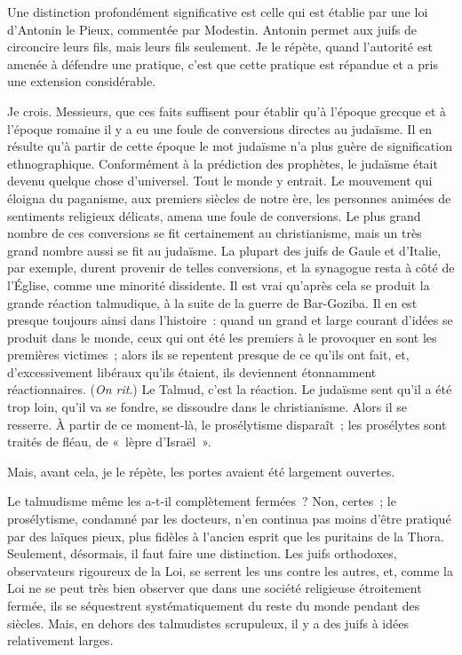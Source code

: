 \documentclass[french,twoside]{book} %
\newcommand\orgName[1]{#1}
\newcommand\persName[1]{#1}
\newcommand\placeName[1]{#1}
\begin{document}
Une distinction profondément significative est celle qui est établie par une loi d’{\persName Antonin le Pieux}, commentée par {\persName Modestin}. {\persName Antonin} permet aux juifs de circoncire leurs fils, mais leurs fils seulement. Je le répète, quand l’autorité est amenée à défendre une pratique, c’est que cette pratique est répandue et a pris une extension considérable.\par
Je crois. Messieurs, que ces faits suffisent pour établir qu’à l’époque grecque et à l’époque romaine il y a eu une foule de conversions directes au judaïsme. Il en résulte qu’à partir de cette époque le mot judaïsme n’a plus guère de signification ethnographique. Conformément à la prédiction des prophètes, le judaïsme était devenu quelque chose d’universel. Tout le monde y entrait. Le mouvement qui éloigna du paganisme, aux premiers siècles de notre ère, les personnes animées de sentiments religieux délicats, amena une foule de conversions. Le plus grand nombre de ces conversions se fit certainement au christianisme, mais un très grand nombre aussi se fit au judaïsme. La plupart des juifs de {\placeName Gaule} et d’{\placeName Italie}, par exemple, durent provenir de telles conversions, et la synagogue resta à côté de l’{\orgName Église}, comme une minorité dissidente. Il est vrai qu’après cela se produit la grande réaction talmudique, à la suite de la guerre de {\persName Bar-Goziba}. Il en est presque toujours ainsi dans l’histoire : quand un grand et large courant d’idées se produit dans le monde, ceux qui ont été les premiers à le provoquer en sont les premières victimes ; alors ils se repentent presque de ce qu’ils ont fait, et, d’excessivement libéraux qu’ils étaient, ils deviennent étonnamment réactionnaires. ({\itshape On rit}.) Le Talmud, c’est la réaction. Le judaïsme sent qu’il a été trop loin, qu’il va se fondre, se dissoudre dans le christianisme. Alors il se resserre. À partir de ce moment-là, le prosélytisme disparaît ; les prosélytes sont traités de fléau, de « lèpre d’{\placeName Israël} ».\par
Mais, avant cela, je le répète, les portes avaient été largement ouvertes.\par
Le talmudisme même les a-t-il complètement fermées ? Non, certes ; le prosélytisme, condamné par les docteurs, n’en continua pas moins d’être pratiqué par des laïques pieux, plus fidèles à l’ancien esprit que les puritains de la Thora. Seulement, désormais, il faut faire une distinction. Les {\orgName juifs orthodoxes}, observateurs rigoureux de la Loi, se serrent les uns contre les autres, et, comme la Loi ne se peut très bien observer que dans une société religieuse étroitement fermée, ils se séquestrent systématiquement du reste du monde pendant des siècles. Mais, en dehors des talmudistes scrupuleux, il y a des juifs à idées relativement larges.\par
\end{document}
